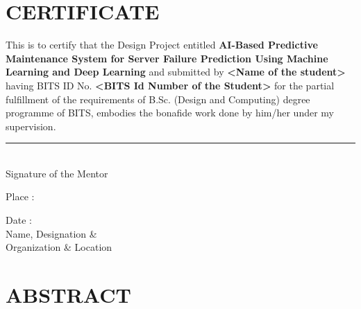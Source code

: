 \documentclass[12pt,letterpaper]{report}
\begin{document}
\chapter*{CERTIFICATE}

\thispagestyle{plain}

\doublespacing

This is to certify that the Design Project entitled \textbf{AI-Based Predictive Maintenance System for Server Failure Prediction Using Machine Learning and Deep Learning} and submitted by \textbf{<Name of the student>} having BITS ID No. \textbf{<BITS Id Number of the Student>} for the partial fulfillment of the requirements of B.Sc. (Design and Computing) degree programme of BITS, embodies the bonafide work done by him/her under my supervision.

\vspace{1in}

\noindent\rule{3in}{0.4pt}\\
Signature of the Mentor

\vspace{0.5in}

\noindent Place : \underline{\hspace{2in}}

\vspace{0.3in}

\noindent Date : \underline{\hspace{2in}} \hspace{1in} \underline{\hspace{2.5in}}\\
\hspace{4.4in} Name, Designation \&\\
\hspace{4.4in} Organization \& Location

\singlespacing

\newpage


\chapter*{ABSTRACT}

\thispagestyle{plain}
\end{document}
